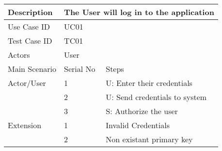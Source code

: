 
\begin{table}[]
    \centering
    \begin{tabular}{|l|llll|}
        \hline

        Description   & \multicolumn{4}{l|}{The User will log in to the application}                                                      \\ \hline
        Use Case ID   & \multicolumn{4}{l|}{UC01}                                                                                         \\ \hline
        Test Case ID  & \multicolumn{4}{l|}{TC01}                                                                                         \\ \hline
        Actors        & \multicolumn{4}{l|}{User}                                                                                         \\ \hline
        Main Scenario & \multicolumn{1}{l|}{Serial No}                               & \multicolumn{3}{l|}{Steps}                         \\ \hline
        Actor/User    & \multicolumn{1}{l|}{1}                                       & \multicolumn{3}{l|}{U: Enter their credentials}    \\ \hline
                      & \multicolumn{1}{l|}{2}                                       & \multicolumn{3}{l|}{U: Send credentials to system} \\ \hline
                      & \multicolumn{1}{l|}{3}                                       & \multicolumn{3}{l|}{S: Authorize the user}         \\ \hline
        Extension     & \multicolumn{1}{l|}{1}                                       & \multicolumn{3}{l|}{Invalid Credentials}           \\ \hline
                      & \multicolumn{1}{l|}{2}                                       & \multicolumn{3}{l|}{Non existant primary key}      \\ \hline
    \end{tabular}
\end{table}

